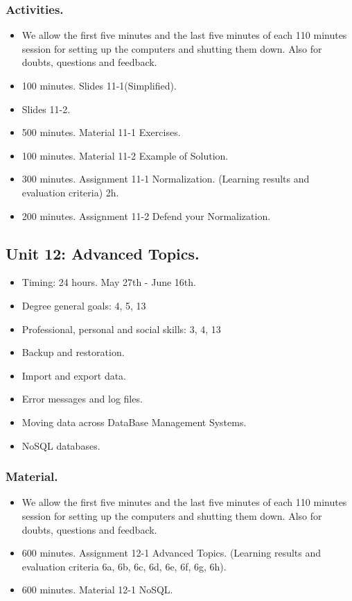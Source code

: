 \documentclass[catalan, a4paper, 12pt, titlepage]{article}
\begin{document}
  \subsubsection{Activities.}
  \begin{itemize}
          \item We allow the first five minutes and the last five minutes of each 110 minutes session for setting up the computers and shutting them down. Also for doubts, questions and feedback.
	  \item 100 minutes. Slides 11-1(Simplified).
	  \item Slides 11-2.
	  \item 500 minutes. Material 11-1 Exercises.
	  \item 100 minutes. Material 11-2 Example of Solution.
	  \item 300 minutes. Assignment 11-1 Normalization. (\faGraduationCap Learning results and evaluation criteria) 2h.
	  \item 200 minutes. Assignment 11-2 Defend your Normalization.
  \end{itemize}


  \subsection{Unit 12: Advanced Topics.}

  \begin{itemize}
	\item Timing: 24 hours. May 27th - June 16th.
	\item Degree general goals: 4, 5, 13
	\item Professional, personal and social skills: 3, 4, 13
  \end{itemize}

  \begin{itemize}
	\item Backup and restoration.
	\item Import and export data.
	\item Error messages and log files.
	\item Moving data across DataBase Management Systems.
	\item NoSQL databases.
  \end{itemize}

  \subsubsection{Material.}
  \begin{itemize}
          \item We allow the first five minutes and the last five minutes of each 110 minutes session for setting up the computers and shutting them down. Also for doubts, questions and feedback.
	  \item 600 minutes. Assignment 12-1 Advanced Topics. (\faGraduationCap Learning results and evaluation criteria 6a, 6b, 6c, 6d, 6e, 6f, 6g, 6h).
	  \item 600 minutes. Material 12-1 NoSQL.
  \end{itemize}
\end{document}
